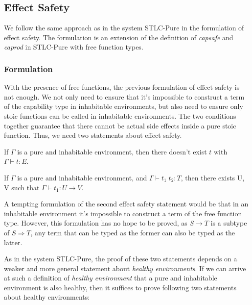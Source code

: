 \subsection{Effect Safety}

We follow the same approach as in the system STLC-Pure in the
formulation of effect safety. The formulation is an extension of the
definition of \emph{capsafe} and \emph{caprod} in STLC-Pure with free
function types.

\subsubsection{Formulation}

With the presence of free functions, the previous formulation of
effect safety is not enough. We not only need to ensure that it's
impossible to construct a term of the capability type in inhabitable
environments, but also need to ensure only stoic functions can be
called in inhabitable environments. The two conditions together
guarantee that there cannot be actual side effects inside a pure stoic
function. Thus, we need two statements about effect safety.

\begin{definition}
  If $\Gamma$ is a pure and inhabitable environment, then there
  doesn't exist $t$ with $\Gamma \vdash t : E$.
\end{definition}

\begin{definition}
  If $\Gamma$ is a pure and inhabitable environment, and
  $\Gamma \vdash t_1 \; t_2 : T$, then there exists U, V such that
  $\Gamma \vdash t_1 : U \to V$.
\end{definition}

A tempting formulation of the second effect safety statement would be
that in an inhabitable environment it's impossible to construct a term
of the free function type. However, this formulation has no hope to be
proved, as $S \to T$ is a subtype of $S \Rightarrow T$, any term that
can be typed as the former can also be typed as the latter.

As in the system STLC-Pure, the proof of these two statements depends
on a weaker and more general statement about \emph{healthy
  environments}. If we can arrive at such a definition of
\emph{healthy environment} that a pure and inhabitable environment is
also healthy, then it suffices to prove following two statements about
healthy environments:

